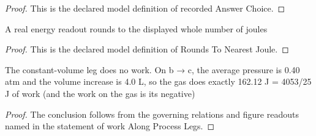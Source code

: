 \begin{proof}
  This is the declared model definition of recorded Answer Choice.
\end{proof}
\begin{definition}
  \label{def:physics:phyx-mini-0337:phyxminiproblems-problemphyxmini0337-roundstonearestjoule}
  A real energy readout rounds to the displayed whole number of joules
\end{definition}
\begin{proof}
  This is the declared model definition of Rounds To Nearest Joule.
\end{proof}
\begin{lemma}
  \label{lem:physics:phyx-mini-0337:phyxminiproblems-problemphyxmini0337-workalongprocesslegs}
  The constant-volume leg does no work. On b → c, the average pressure is 0.40 atm and the volume increase is 4.0 L, so the gas does exactly 162.12 J = 4053/25 J of work (and the work on the gas is its negative)
\end{lemma}
\begin{proof}
  The conclusion follows from the governing relations and figure readouts named in the statement of work Along Process Legs.
\end{proof}
